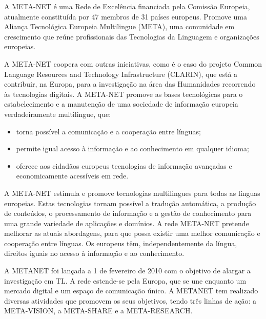\documentclass[]{../metanetpaper}
\begin{document}
\begin{multicols}{2}

 A META-NET é uma Rede de Excelência financiada pela Comissão Europeia, atualmente constituída por 47 membros de 31 países europeus. Promove uma Aliança Tecnológica Europeia Multilingue (META), uma comunidade em crescimento que reúne profissionais das Tecnologias da Linguagem e organizações europeias.

A META-NET coopera com outras iniciativas, como é o caso do projeto Common Language Resources and Technology Infrastructure (CLARIN), que está a contribuir, na Europa, para a investigação na área das Humanidades recorrendo às tecnologias digitais. A META-NET promove as bases tecnológicas para o estabelecimento e a manutenção de uma sociedade de informação europeia verdadeiramente multilingue, que:

\begin{itemize}
    \item torna possível a comunicação e a cooperação entre línguas;
      \item permite igual acesso à informação e ao conhecimento em qualquer idioma;
      \item oferece aos cidadãos europeus tecnologias de informação avançadas e economicamente acessíveis em rede.
\end{itemize}

A META-NET estimula e promove tecnologias multilingues para todas as línguas europeias. Estas tecnologias tornam possível a tradução automática, a produção de conteúdos, o processamento de informação e a gestão de conhecimento para uma grande variedade de aplicações e domínios. A rede META-NET pretende melhorar as atuais abordagens, para que possa existir uma melhor comunicação e cooperação entre línguas. Os europeus têm, independentemente da língua, direitos iguais no acesso à informação e ao conhecimento. 

 A METANET foi lançada a 1 de fevereiro de 2010 com o objetivo de alargar a investigação em TL. A rede estende-se pela Europa, que se une enquanto um mercado digital e um espaço de comunicação único. A METANET tem realizado diversas atividades que promovem os seus objetivos, tendo três linhas de ação: a META-VISION, a META-SHARE e a META-RESEARCH.


\end{multicols}
\end{document}
